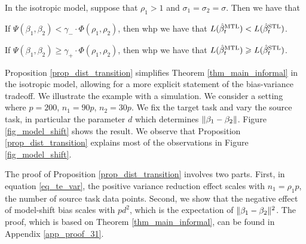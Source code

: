 \begin{proposition}\label{prop_dist_transition}
	In the isotropic model, suppose that $\rho_1 > 1$ and $\sigma_1 = \sigma_2 = \sigma$.
	Then we have that
	\squishlist
		\item If $\Psi(\beta_1, \beta_2) < \gamma_{-} \cdot \Phi(\rho_1, \rho_2)$, then whp we have that $L(\hat{\beta}_t^{\text{MTL}}) < L(\hat{\beta}_t^{\text{STL}})$.
		\item If $\Psi(\beta_1, \beta_2) \ge \gamma_{+} \cdot \Phi(\rho_1, \rho_2)$, then whp we have that $L(\hat{\beta}_t^{\text{MTL}}) \geqslant L(\hat{\beta}_t^{\text{STL}})$.
	\squishend
\end{proposition}

Proposition \ref{prop_dist_transition} simplifies Theorem \ref{thm_main_informal} in the isotropic model, allowing for a more explicit statement of the bias-variance tradeoff.
\todo{} We illustrate the example with a simulation.
We consider a setting where $p = 200$, $n_1 = 90p$, $n_2 = 30p$.
We fix the target task and vary the source task, in particular the parameter $d$ which determines $\|\beta_1 - \beta_2\|$.
Figure \ref{fig_model_shift} shows the result.
We observe that Proposition \ref{prop_dist_transition} explains most of the observations in Figure \ref{fig_model_shift}.


The proof of Proposition \ref{prop_dist_transition} involves two parts.
First, in equation \eqref{eq_te_var}, the positive variance reduction effect scales with $n_1 = \rho_1 p$, the number of source task data points.
Second, we show that the negative effect of model-shift bias scales with $pd^2$, which is the expectation of $\|\beta_1 - \beta_2\|^2$.
The proof, which is based on Theorem \ref{thm_main_informal}, can be found in Appendix \ref{app_proof_31}. %

